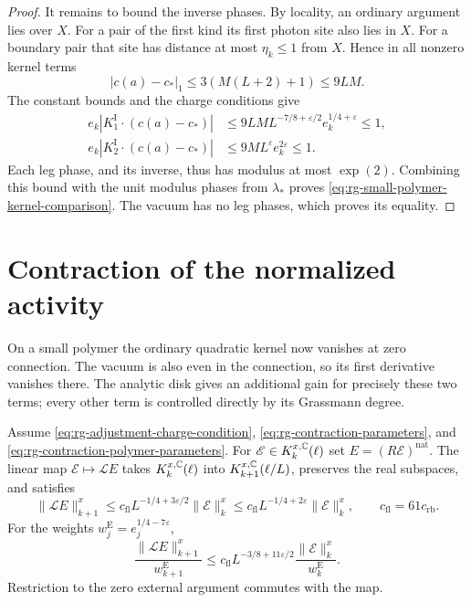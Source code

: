 \begin{proof}
It remains to bound the inverse phases. By locality,
an ordinary argument lies over $X$. For a pair of the
first kind its first photon site also lies in $X$.
For a boundary pair that site has distance at most
$\eta_k\le1$ from $X$. Hence in all nonzero kernel terms
\[
 |c(a)-c_*|_1\le3(M(L+2)+1)\le9LM.
\]
The constant bounds and the charge conditions give
\[
 \begin{split}
 e_k|K_1^{\mathrm I}\cdot(c(a)-c_*)|
       &\le9LM L^{-7/8+\varepsilon/2}e_k^{1/4+\varepsilon}
                                                    \le1,\\
 e_k|K_2^{\mathrm I}\cdot(c(a)-c_*)|
       &\le9ML^\varepsilon e_k^{2\varepsilon}\le1.
 \end{split}
\]
Each leg phase, and its inverse, thus has modulus at most
$\exp(2)$. Combining this bound with the unit modulus
phases from $\lambda_*$ proves
\eqref{eq:rg-small-polymer-kernel-comparison}.
The vacuum has no leg phases, which proves its equality.
\end{proof}
\section{Contraction of the normalized activity}
\label{subsec:rg-activity-contraction}

On a small polymer the ordinary quadratic kernel now vanishes
at zero connection. The vacuum is also even in the connection,
so its first derivative vanishes there. The analytic
disk gives an additional gain for precisely these two
terms; every other term is controlled directly by its
Grassmann degree.

\begin{proposition}\label{prop:rg-activity-contraction}
Assume \eqref{eq:rg-adjustment-charge-condition},
\eqref{eq:rg-contraction-parameters}, and \eqref{eq:rg-contraction-polymer-parameters}.
For $\mathscr E\in K_k^{x,\mathbb C}(\ell)$ set
$E=(R\mathscr E)^{\mathrm{nat}}$.
The linear map $\mathscr E\mapsto\mathcal L E$ takes
$K_k^{x,\mathbb C}(\ell)$ into $K_{k+1}^{x,\mathbb C}(\ell/L)$,
preserves the real subspaces, and satisfies
\begin{equation}\label{eq:rg-contraction-norm}
 \|\mathcal L E\|_{k+1}^x
       \le c_{\mathrm{fl}}L^{-1/4+3\varepsilon/2}\|\mathscr E\|_k^x
       \le c_{\mathrm{fl}}L^{-1/4+2\varepsilon}\|\mathscr E\|_k^x,
       \qquad c_{\mathrm{fl}}=61c_{\mathrm{rb}}.
\end{equation}
For the weights $w_j^{\mathrm E}=e_j^{1/4-7\varepsilon}$,
\begin{equation}\label{eq:rg-contraction-window}
 \frac{\|\mathcal L E\|_{k+1}^x}{w_{k+1}^{\mathrm E}}
       \le c_{\mathrm{fl}}L^{-3/8+11\varepsilon/2}
                       \frac{\|\mathscr E\|_k^x}{w_k^{\mathrm E}}.
\end{equation}
Restriction to the zero external argument commutes with
the map.
\end{proposition}

